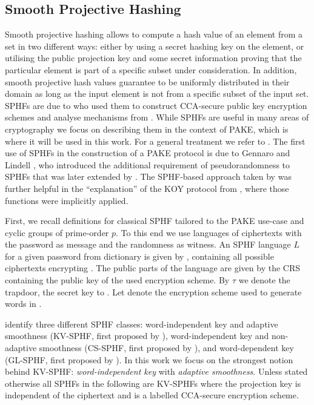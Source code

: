 \subsection{Smooth Projective Hashing}
Smooth projective hashing allows to compute a hash value of an element from a set in two different ways:
either by using a secret hashing key on the element, or utilising the public projection key and some secret information proving that the particular element is part of a specific subset under consideration.
In addition, smooth projective hash values guarantee to be uniformly distributed in their domain as long as the input element is not from a specific subset of the input set.
\aclp{SPHF} are due to \citet{Cramer2002} who used them to construct \ac{CCA}-secure public key encryption schemes and analyse mechanisms from \citet{Cramer1998}.
While \acp{SPHF} are useful in many areas of cryptography we focus on describing them in the context of \ac{PAKE}, which is where it will be used in this work.
For a general treatment we refer to \cite{Cramer2002,cryptoeprint:2013:034}.
The first use of \acp{SPHF} in the construction of a \ac{PAKE} protocol is due to Gennaro and Lindell \cite{Gennaro2003}, who introduced the additional requirement of pseudorandomness to \acp{SPHF} that was later extended by \citet{Katz2011}.
The \ac{SPHF}-based approach taken by \citet{Gennaro2003} was further helpful in the ``explanation'' of the KOY protocol from \citet{KatzOY01}, where those functions were implicitly applied.

First, we recall definitions for classical \ac{SPHF} tailored to the \ac{PAKE} use-case and cyclic groups \GG of prime-order $p$.
To this end we use languages of ciphertexts with the password as message and the randomness as witness.
An \ac{SPHF} language $L$ for a given password \pwd from dictionary \cD is given by \Lpwd, containing all possible ciphertexts encrypting \pwd. 
The public parts of the language are given by the \acl{CRS} \crs containing the public key \pk of the used encryption scheme.
By $\tau$ we denote the \crs trapdoor, the secret key to \pk.
Let \cL denote the encryption scheme used to generate words in \Lpwd.

\citet{Benhamouda2013} identify three different \ac{SPHF} classes:
word-independent key and adaptive smoothness (KV-SPHF, first proposed by \citet{Katz2011}),
word-independent key and non-adaptive smoothness (CS-SPHF, first proposed by \citet{Cramer2002}),
and word-dependent key (GL-SPHF, first proposed by \citet{Gennaro2003}).
In this work we focus on the strongest notion behind KV-SPHF: \emph{word-independent key} with \emph{adaptive smoothness}.
Unless stated otherwise all \acp{SPHF} in the following are KV-SPHFs where the projection key is independent of the ciphertext and \cL is a labelled CCA-secure encryption scheme.

